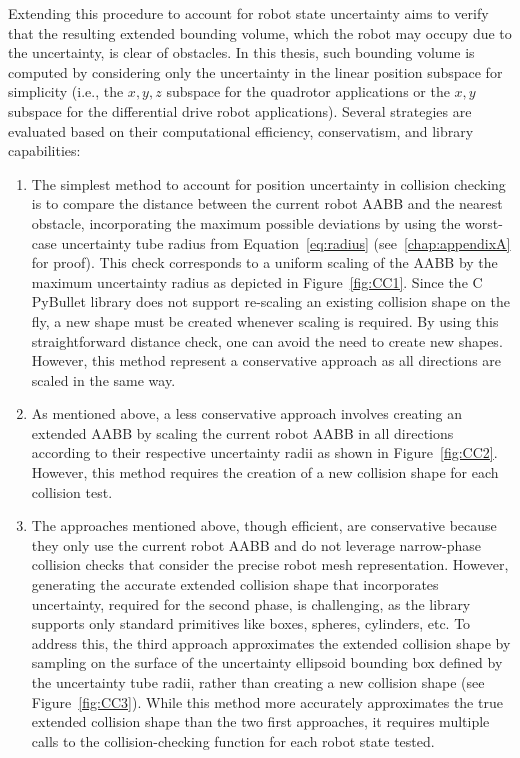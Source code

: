 Extending this procedure to account for robot state uncertainty aims to verify that the resulting extended bounding volume, which the robot may occupy due to the uncertainty, is clear of obstacles.
In this thesis, such bounding volume is computed by considering only the uncertainty in the linear position subspace for simplicity (i.e., the $x,y,z$ subspace for the quadrotor applications or the $x,y$ subspace for the differential drive robot applications).
Several strategies are evaluated based on their computational efficiency, conservatism, and library capabilities:
\begin{enumerate}
    \item The simplest method to account for position uncertainty in collision checking is to compare the distance between the current robot AABB and the nearest obstacle, incorporating the maximum possible deviations by using the worst-case uncertainty tube radius from Equation~\ref{eq:radius} (see~\ref{chap:appendixA} for proof).
    This check corresponds to a uniform scaling of the AABB by the maximum uncertainty radius as depicted in Figure~\ref{fig:CC1}. 
    Since the C PyBullet library does not support re-scaling an existing collision shape on the fly, a new shape must be created whenever scaling is required. 
    By using this straightforward distance check, one can avoid the need to create new shapes.
    However, this method represent a conservative approach as all directions are scaled in the same way.
    \item As mentioned above, a less conservative approach involves creating an extended AABB by scaling the current robot AABB in all directions according to their respective uncertainty radii as shown in Figure~\ref{fig:CC2}. 
    However, this method requires the creation of a new collision shape for each collision test.
    \item The approaches mentioned above, though efficient, are conservative because they only use the current robot AABB and do not leverage narrow-phase collision checks that consider the precise robot mesh representation. 
    However, generating the accurate extended collision shape that incorporates uncertainty, required for the second phase, is challenging, as the library supports only standard primitives like boxes, spheres, cylinders, etc.
    To address this, the third approach approximates the extended collision shape by sampling on the surface of the uncertainty ellipsoid bounding box defined by the uncertainty tube radii, rather than creating a new collision shape (see Figure~\ref{fig:CC3}). 
    While this method more accurately approximates the true extended collision shape than the two first approaches, it requires multiple calls to the collision-checking function for each robot state tested.
\end{enumerate}

